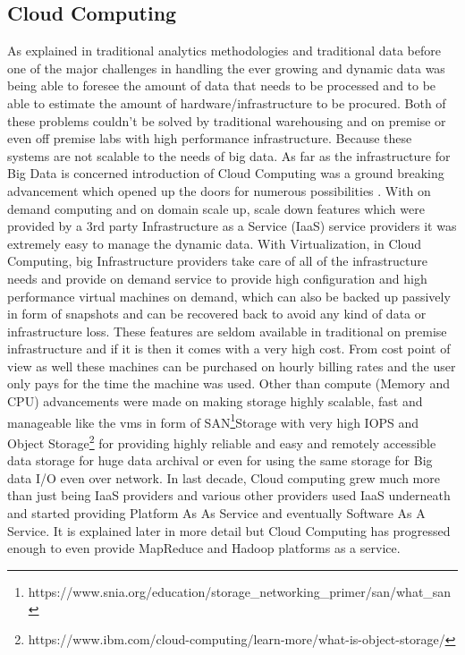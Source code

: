 \documentclass[sigconf]{acmart}
\begin{document}
\subsection{Cloud Computing}
As explained in traditional analytics methodologies and traditional data before one of the major challenges in handling the ever growing and dynamic data was being able to foresee the amount of data that needs to be processed and to be able to estimate the amount of hardware/infrastructure to be procured. Both of these problems couldn't be solved by traditional warehousing and on premise or even off premise labs with high performance infrastructure. Because these systems are not scalable to the needs of big data. As far as the infrastructure for Big Data is concerned introduction of Cloud Computing was a ground breaking advancement which opened up the doors for numerous possibilities \cite{krishnan}. With on demand computing and on domain scale up, scale down features which were provided by a 3rd party Infrastructure as a Service (IaaS) service providers it was extremely easy to manage the dynamic data. With Virtualization, in Cloud Computing, big Infrastructure providers take care of all of the infrastructure needs and provide on demand service to provide high configuration and high performance virtual machines on demand, which can also be backed up passively in form of snapshots and can be recovered back to avoid any kind of data or infrastructure loss. These features are seldom available in traditional on premise infrastructure and if it is then it comes with a very high cost. From cost point of view as well these machines can be purchased on hourly billing rates and the user only pays for the time the machine was used. Other than compute (Memory and CPU) advancements were made on making storage highly scalable, fast and manageable like the vms in form of SAN\footnote{https://www.snia.org/education/storage\_networking\_primer/san/what\_san}Storage with very high IOPS and Object Storage\footnote{https://www.ibm.com/cloud-computing/learn-more/what-is-object-storage/} for providing highly reliable and easy and remotely accessible data storage for huge data archival or even for using the same storage for Big data I/O even over network\cite{intelstorage}. In last decade, Cloud computing grew much more than just being IaaS providers and various other providers used IaaS underneath and started providing Platform As As Service and eventually Software As A Service. It is explained later in more detail but Cloud Computing has progressed enough to even provide MapReduce and Hadoop platforms as a service.
\end{document}
